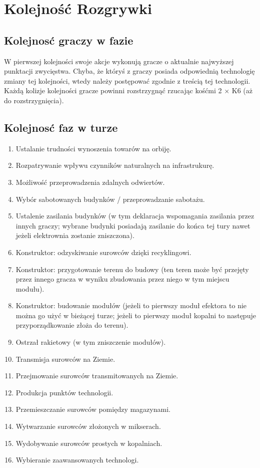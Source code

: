 \documentclass[11pt,a4paper]{article}
\begin{document}
\section{Kolejność Rozgrywki}

\subsection{Kolejnosć graczy w fazie}

W pierwszej kolejności swoje akcje wykonują gracze o aktualnie najwyższej punktacji zwycięstwa. Chyba, że któryś z graczy posiada odpowiednią technologię zmiany tej kolejności, wtedy należy postępować zgodnie z treścią tej technologii. Każdą kolizje kolejności gracze powinni rozstrzygnąć rzucając kośćmi 2 $\times$ K6 (aż do rozstrzygnięcia).

\subsection{Kolejnosć faz w turze}

\begin{enumerate}
  \setlength{\parskip}{0pt}
  \setlength{\itemsep}{0pt plus 1pt}
\item Ustalanie trudności wynoszenia towarów na orbiję.
\item Rozpatrywanie wpływu czynników naturalnych na infrastrukurę.
\item Możliwość przeprowadzenia zdalnych odwiertów.
\item Wybór sabotowanych budynków / przeprowadzanie sabotażu.
\item Ustalenie zasilania budynków (w tym deklaracja wspomagania zasilania przez innych graczy; wybrane budynki posiadają zasilanie do końca tej tury nawet jeżeli elektrownia zostanie zniszczona).
\item Konstruktor: odzyskiwanie surowców dzięki recyklingowi.
\item Konstruktor: przygotowanie terenu do budowy (ten teren może być przejęty przez innego gracza w wyniku zbudowania przez niego w tym miejscu modułu).
\item Konstruktor: budowanie modułów (jeżeli to pierwszy moduł efektora to nie można go użyć w bieżącej turze; jeżeli to pierwszy moduł kopalni to następuje przyporządkowanie złoża do terenu).
\item Ostrzał rakietowy (w tym zniszczenie modułów).
\item Transmisja surowców na Ziemie.
\item Przejmowanie surowców transmitowanych na Ziemie.
\item Produkcja punktów technologii.
\item Przemieszczanie surowców pomiędzy magazynami.
\item Wytwarzanie surowców złożonych w mikserach.
\item Wydobywanie surowców prostych w kopalniach.
\item Wybieranie zaawansowanych technologi.
\end{enumerate}
\end{document}
